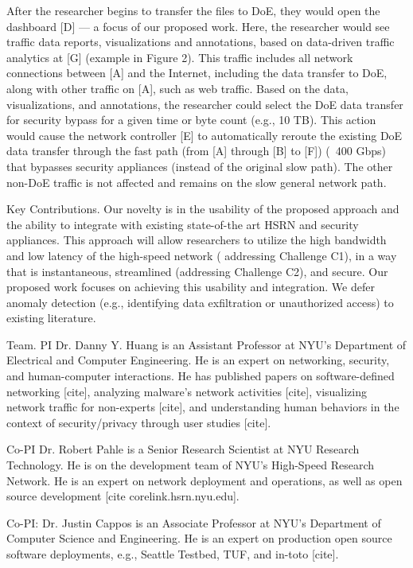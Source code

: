 After the researcher begins to transfer the files to DoE, they would open the dashboard [D] — a focus of our proposed work. Here, the researcher would see traffic data reports, visualizations and annotations, based on data-driven traffic analytics at [G] (example in Figure 2). This traffic includes all network connections between [A] and the Internet, including the data transfer to DoE, along with other traffic on [A], such as web traffic. Based on the data, visualizations, and annotations, the researcher could select the DoE data transfer for security bypass for a given time or byte count (e.g., 10 TB). This action would cause the network controller [E] to automatically reroute  the existing DoE data transfer through the fast path (from [A] through [B] to [F]) (~400 Gbps) that bypasses security appliances (instead of the original slow path). The other non-DoE traffic is not affected and remains on the slow general network path.

Key Contributions. Our novelty is in the usability of the proposed approach and the ability to integrate with existing state-of-the art HSRN and security appliances. This approach will allow researchers to utilize the high bandwidth and low latency of the high-speed network ( addressing Challenge C1), in a way that is instantaneous, streamlined (addressing Challenge C2), and secure. Our proposed work focuses on achieving this usability and integration. We defer anomaly detection (e.g., identifying data exfiltration or unauthorized access) to existing literature.

Team. PI Dr. Danny Y. Huang is an Assistant Professor at NYU's Department of Electrical and Computer Engineering. He is an expert on networking, security, and human-computer interactions. He has published papers on software-defined networking [cite], analyzing malware's network activities [cite], visualizing network traffic for non-experts [cite], and understanding human behaviors in the context of security/privacy through user studies [cite].

Co-PI Dr. Robert Pahle is a Senior Research Scientist at NYU Research Technology. He is on the development team of NYU's High-Speed Research Network. He is an expert on network deployment and operations, as well as open source development [cite corelink.hsrn.nyu.edu].

Co-PI: Dr. Justin Cappos is an Associate Professor at NYU's Department of Computer Science and Engineering. He is an expert on production open source software deployments, e.g., Seattle Testbed, TUF, and in-toto [cite].

